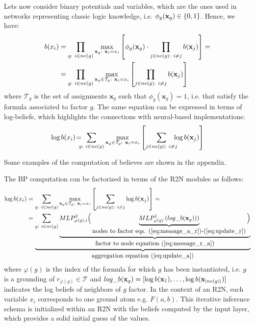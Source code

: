 \documentclass[journal]{IEEEtran}
\begin{document}
Lets now consider binary potentials and variables, which are the ones used in networks representing classic logic knowledge, i.e. $\phi_g({\bf x}_g) \in\{0,1\}$.
Hence, we have:
\begin{align}
b(x_i) &= \displaystyle\prod_{g:\ i \in ne(g)} \max_{\mathbf{x}_g:\ \mathbf{x}_i=x_i} \left[ \phi_g(\mathbf{x}_g) \cdot \displaystyle\prod_{j \in ne(g):\ i \ne j} b({\bf x}_j) \right] = \nonumber \\
&= \displaystyle\prod_{g:\ i \in ne(g)} \max_{\mathbf{x}_g \in \mathcal{T}_g:\  \mathbf{x}_i=x_i} \left[ \displaystyle\prod_{j \in ne(g):\ i \ne j} b({\bf x}_j) \right] \label{eq:belief_as_input_function}
\end{align}
where $\mathcal{T}_g$ is the set of  assignments $\mathbf{x}_g$ such that $\phi_g(\mathbf{x}_g)=1$, i.e. that satisfy the formula associated to factor $g$.
The same equation can be expressed in terms of log-beliefs, which highlights the connections with neural-based implementations:
\begin{equation}
\log b(x_i) \!=\!\!\!\!\sum_{g:\ i \in ne(g)} \max_{\mathbf{x}_g\in \mathcal{T}_g:\ \mathbf{x}_i=x_i} \left[ \sum_{j \in ne(g):\ i \ne j} \!\!\!\! \log b({\bf x}_j) \right] \label{eq:log_belief_as_input_function}
\end{equation}

Some examples of the computation of believes are shown in the appendix.

 The BP computation can be factorized in terms of the R2N modules as follows:
\begin{align*}
\log b(x_i) &=  \sum_{g:\ i \in ne(g)} \max_{\mathbf{x}_g\in \mathcal{T}_g:\  {\bf x}_i=x_i} \left[ \displaystyle\sum_{j \in ne(g):\ i \ne j} \log b({\bf x}_j) \right] = \\
&=
\underbrace{\sum_{g:\ i \in ne(g)}\underbrace{MLP^2_{\varphi(g),i}
\Big(\underbrace{MLP^1_{\varphi(g)} \left(log\_b({\bf x}_{g}))\right)}_{\mbox{nodes to factor eqs. (\ref{eq:message_a_r})-(\ref{eq:update_r})}}\Big)}_{\mbox{factor to node equation (\ref{eq:message_r_a})}}}_{\mbox{aggregation equation~(\ref{eq:update_a})}}
\label{eq:fgnn_decomposition2}
\end{align*}
where $\varphi(g)$ is the index of the formula for which $g$ has been instantiated, i.e. $g$ is a grounding of $r_{\varphi(g)} \in \mathcal{T}$ and $log\_b({\bf x}_{g}) = [\log b({\bf x}_1), \ldots, \log b({\bf x}_{|ne(g)|}) ]$ indicates the log beliefs of neighbors of $g$ factor. In the context of an R2N, each variable $x_i$ corresponds to one ground atom e.g. $F(a,b)$. This iterative inference schema is initialized within an R2N with the beliefs computed by the input layer, which provides a solid initial guess of the values.
\end{document}

